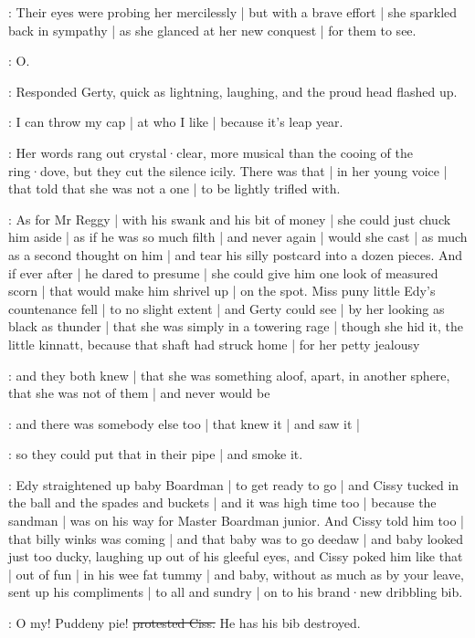 \gertyRomantic:
Their eyes were probing her mercilessly |
but with a brave effort |
she sparkled back in sympathy |
as she glanced at her new conquest |
for them to see.

\gerty:
O.

:
Responded Gerty,
quick as lightning,
laughing,
and the proud head flashed up.

\gerty:
I can throw my cap |
at who I like |%
because it's leap year.

\gertyNovel:
Her words rang out crystal·clear,
more musical
than the cooing of the ring·dove,
but they cut the silence icily.
There was that |
in her young voice |
that told
that she was not a one |
to be lightly trifled with.

\gertyJudgy:
As for Mr Reggy |
with his swank and his bit of money |
she could just chuck him aside |
as if he was so much filth |
and never again |
would she cast |
as much as a second thought on him |
and tear his silly postcard into a dozen pieces.
And if ever after |
he dared to presume |
she could give him one look of measured scorn |
that would make him shrivel up |
on the spot.
Miss puny little Edy's countenance fell |
to no slight extent |
and Gerty could see |
by her looking as black as thunder |%
that she was simply in a towering rage |
though she hid it,
the little kinnatt,
because that shaft had struck home |
for her petty jealousy

\gertyNovel:
and they both knew |
that she was something aloof,
apart,
in another sphere,
that she was not of them |
and never would be

\gertySex:
and there was somebody else too |
that knew it |
and saw it |

\gertyJudgy:
so they could put that in their pipe |
and smoke it.

:
Edy straightened up baby Boardman |
to get ready to go |
and Cissy tucked in
the ball and the spades and buckets |
and it was high time too |
because the sandman |
was on his way for Master Boardman junior.
And Cissy told him too |
that billy winks was coming |
and that baby was to go deedaw |
and baby looked just too ducky,
laughing up out of his gleeful eyes,
and Cissy poked him like that |%
out of fun |
in his wee fat tummy |
and baby,
without as much as by your leave,
sent up his compliments |
to all and sundry |
on to his brand·new dribbling bib.

\cissy:
O my!
Puddeny pie!
\sout{protested Ciss.}
He has his bib destroyed.

